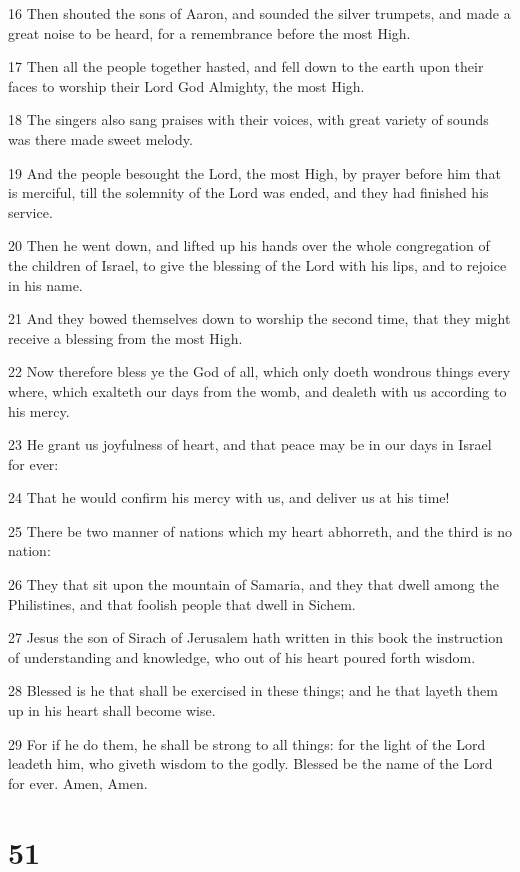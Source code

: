 \par 16 Then shouted the sons of Aaron, and sounded the silver trumpets, and made a great noise to be heard, for a remembrance before the most High.
\par 17 Then all the people together hasted, and fell down to the earth upon their faces to worship their Lord God Almighty, the most High.
\par 18 The singers also sang praises with their voices, with great variety of sounds was there made sweet melody.
\par 19 And the people besought the Lord, the most High, by prayer before him that is merciful, till the solemnity of the Lord was ended, and they had finished his service.
\par 20 Then he went down, and lifted up his hands over the whole congregation of the children of Israel, to give the blessing of the Lord with his lips, and to rejoice in his name.
\par 21 And they bowed themselves down to worship the second time, that they might receive a blessing from the most High.
\par 22 Now therefore bless ye the God of all, which only doeth wondrous things every where, which exalteth our days from the womb, and dealeth with us according to his mercy.
\par 23 He grant us joyfulness of heart, and that peace may be in our days in Israel for ever:
\par 24 That he would confirm his mercy with us, and deliver us at his time!
\par 25 There be two manner of nations which my heart abhorreth, and the third is no nation:
\par 26 They that sit upon the mountain of Samaria, and they that dwell among the Philistines, and that foolish people that dwell in Sichem.
\par 27 Jesus the son of Sirach of Jerusalem hath written in this book the instruction of understanding and knowledge, who out of his heart poured forth wisdom.
\par 28 Blessed is he that shall be exercised in these things; and he that layeth them up in his heart shall become wise.
\par 29 For if he do them, he shall be strong to all things: for the light of the Lord leadeth him, who giveth wisdom to the godly. Blessed be the name of the Lord for ever. Amen, Amen.

\chapter{51}


